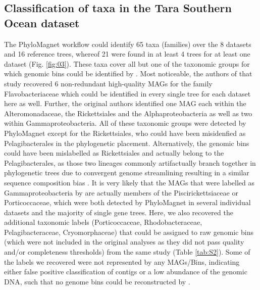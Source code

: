 \documentclass{bioinfo}
\begin{document}
\subsection{Classification of taxa in the Tara Southern Ocean dataset}
The PhyloMagnet workflow could identify 65 taxa (families) over the 8 datasets and 16 reference trees, whereof 21 were found in at least 4 trees for at least one dataset (Fig. \ref{fig:03}). These taxa cover all but one of the taxonomic groups for which genomic bins could be identified by \citet[][marked with an asterisk in Fig. \ref{fig:03}]{Delmont2018}. Most noticeable, the authors of that study recovered 6 non-redundant high-quality MAGs for the family Flavobacteriaceae which could be identified in every single tree for each dataset here as well. Further, the original authors identified one MAG each within the Alteromonadaceae, the Rickettsiales and the Alphaproteobacteria as well as two within Gammaproteobacteria. All of these taxonomic groups were detected by PhyloMagnet except for the Rickettsiales, who could have been misidenfied as Pelagibacterales in the phylogenetic placement. Alternatively, the genomic bins could have been mislabelled as Rickettsiales and actually belong to the Pelagibacterales, as those two lineages commonly artifactually branch together in phylogenetic trees due to convergent genome streamlining resulting in a similar sequence composition bias \citep{Roger2017,Martijn2018,Rodriguez-Ezpeleta2012,Viklund2013}. It is very likely that the MAGs that were labelled as Gammaproteobacteria by \citet{Delmont2018} are actually members of the Piscirickettsiaceae or Porticoccaceae, which were both detected by PhyloMagnet in several individual datasets and the majority of single gene trees. Here, we also recovered the additional taxonomic labels (Porticoccaceae, Rhodobacteraceae, Pelagibacteraceae, Cryomorphaceae) that could be assigned to raw genomic bins (which were not included in the original analyses as they did not pass quality and/or completeness thresholds) from the same study (Table \ref{tab:S2}). Some of the labels we recovered were not represented by any MAGs/Bins, indicating either false positive classification of contigs or a low abundance of the genomic DNA, such that no genome bins could be reconstructed by \citet{Delmont2018}.
\end{document}
